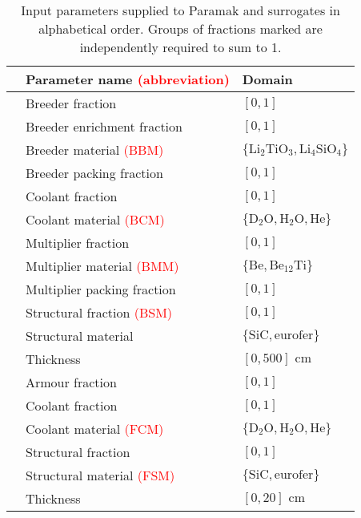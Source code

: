 \begin{table}[t]
	\setlength\tabcolsep{2pt}
	\renewcommand{\arraystretch}{0.95}
	\caption{\label{tbl:params}Input parameters supplied to Paramak and surrogates in alphabetical order. Groups of fractions marked\textsuperscript{\textdagger
		\textdaggerdbl} are independently required to sum to 1.}
	\begin{indented}
	\item[]
		\begin{tabular}{l|ll}
		\toprule
		{} & Parameter name \textcolor{red}{(abbreviation)} & Domain\\
		\midrule
		\parbox[t]{2mm}{\hspace{-2pt}}
		   & Breeder fraction\textsuperscript{\textdagger} & $[0,1]$\\
		   & Breeder  enrichment fraction & $[0,1]$\\
		   & Breeder material \textcolor{red}{(BBM)} & $\{\text{Li}_2\text{TiO}_3, \text{Li}_4\text{SiO}_4\}$\\
		   & Breeder packing fraction & $[0,1]$\\
		   & Coolant fraction\textsuperscript{\textdagger} & $[0,1]$\\
		   & Coolant material \textcolor{red}{(BCM)} & $\{\text{D}_2\text{O}, \text{H}_2\text{O}, \text{He}\}$\\
		   & Multiplier fraction\textsuperscript{\textdagger} & $[0,1]$\\
		   & Multiplier material \textcolor{red}{(BMM)} & $\{\text{Be}, \text{Be}_{12}\text{Ti}\}$\\
		   & Multiplier packing fraction & $[0,1]$\\
		   & Structural fraction\textsuperscript{\textdagger} \textcolor{red}{(BSM)} & $[0,1]$\\
		   & Structural material & $\{\text{SiC}, \text{eurofer}\}$\\
		   & Thickness & $[0,500]\text{ cm}$\\
		\midrule
		\parbox[t]{2mm}{\hspace{-2pt}}
		   & Armour fraction\textsuperscript{\textdaggerdbl} & $[0,1]$\\
		   & Coolant fraction\textsuperscript{\textdaggerdbl} & $[0,1]$\\
		   & Coolant material \textcolor{red}{(FCM)} & $\{\text{D}_2\text{O}, \text{H}_2\text{O}, \text{He}\}$\\
		   & Structural fraction\textsuperscript{\textdaggerdbl} & $[0,1]$\\
		   & Structural material \textcolor{red}{(FSM)} & $\{\text{SiC}, \text{eurofer}\}$\\
		   & Thickness & $[0,20]\text{ cm}$\\
		\bottomrule
		\end{tabular}
	\end{indented}
\end{table}

